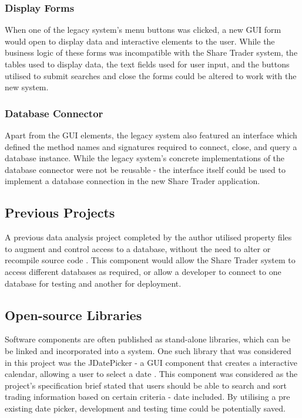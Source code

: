 \documentclass[12pt, a4paper,titlepage]{article}
\begin{document}
\subsubsection{Display Forms}
When one of the legacy system’s menu buttons was clicked, a new GUI form would
open to display data and interactive elements to the user.  
While the business logic of these forms was incompatible with the Share
Trader system, the tables used to display data, the text fields used for user
input, and the buttons utilised to submit searches and close the forms could
be altered to work with the new system.

\subsubsection{Database Connector}
Apart from the GUI elements, the legacy system also featured an interface
which defined the method names and signatures required to connect, close, and
query a database instance. 
While the legacy system’s concrete implementations of the database connector
were not be reusable - the interface itself could be used to implement a 
database connection in the new Share Trader application.

\subsection{Previous Projects}
A previous data analysis project completed by the author utilised property
files to augment and control access to a database, without the need to alter
or recompile source code \cite{Dixon2017}.  
This component would allow the Share Trader system
to access different databases as required, or allow a developer to connect to
one database for testing and another for deployment.

\subsection{Open-source Libraries}
Software components are often published as stand-alone libraries, which can be
be linked and incorporated into a system. 
One such library that was considered in this project was the JDatePicker - a
GUI component that creates a interactive calendar, allowing a user to select a
date \cite{Jdate}. 
This component was considered as the project's specification brief stated that
users should be able to search and sort trading information based on certain
criteria - date included. 
By utilising a pre existing date picker, development and testing time could be
potentially saved.
\end{document}
